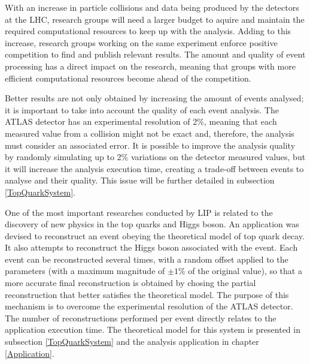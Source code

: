 With an increase in particle collisions and data being produced by the detectors at the LHC, research groups will need a larger budget to aquire and maintain the required computational resources to keep up with the analysis. Adding to this increase, research groups working on the same experiment enforce positive competition to find and publish relevant results. The amount and quality of event processing has a direct impact on the research, meaning that groups with more efficient computational resources become ahead of the competition.

Better results are not only obtained by increasing the amount of events analysed; it is important to take into account the quality of each event analysis. The ATLAS detector has an experimental resolution of 2\%, meaning that each measured value from a collision might not be exact and, therefore, the analysis must consider an associated error. It is possible to improve the analysis quality by randomly simulating up to 2\% variations on the detector measured values, but it will increase the analysis execution time, creating a trade-off between events to analyse and their quality. This issue will be further detailed in subsection \ref{TopQuarkSystem}.

One of the most important researches conducted by LIP is related to the discovery of new physics in the top quarks and Higgs boson. An application was devised to reconstruct an event obeying the theoretical model of top quark decay. It also attempts to reconstruct the Higgs boson associated with the event. Each event can be reconstructed several times, with a random offset applied to the parameters (with a maximum magnitude of $\pm1\%$ of the original value), so that a more accurate final reconstruction is obtained by chosing the partial reconstruction that better satisfies the theoretical model. The purpose of this mechanism is to overcome the experimental resolution of the ATLAS detector. The number of reconstructions performed per event directly relates to the application execution time. The theoretical model for this system is presented in subsection \ref{TopQuarkSystem} and the analysis application in chapter \ref{Application}.

